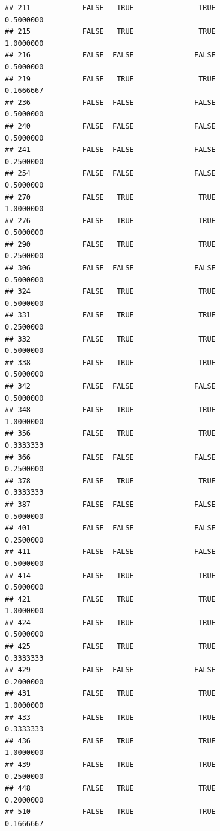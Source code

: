 \documentclass[
]{article}
\begin{document}
\begin{verbatim}
## 211            FALSE   TRUE               TRUE                0.5000000
## 215            FALSE   TRUE               TRUE                1.0000000
## 216            FALSE  FALSE              FALSE                0.5000000
## 219            FALSE   TRUE               TRUE                0.1666667
## 236            FALSE  FALSE              FALSE                0.5000000
## 240            FALSE  FALSE              FALSE                0.5000000
## 241            FALSE  FALSE              FALSE                0.2500000
## 254            FALSE  FALSE              FALSE                0.5000000
## 270            FALSE   TRUE               TRUE                1.0000000
## 276            FALSE   TRUE               TRUE                0.5000000
## 290            FALSE   TRUE               TRUE                0.2500000
## 306            FALSE  FALSE              FALSE                0.5000000
## 324            FALSE   TRUE               TRUE                0.5000000
## 331            FALSE   TRUE               TRUE                0.2500000
## 332            FALSE   TRUE               TRUE                0.5000000
## 338            FALSE   TRUE               TRUE                0.5000000
## 342            FALSE  FALSE              FALSE                0.5000000
## 348            FALSE   TRUE               TRUE                1.0000000
## 356            FALSE   TRUE               TRUE                0.3333333
## 366            FALSE  FALSE              FALSE                0.2500000
## 378            FALSE   TRUE               TRUE                0.3333333
## 387            FALSE  FALSE              FALSE                0.5000000
## 401            FALSE  FALSE              FALSE                0.2500000
## 411            FALSE  FALSE              FALSE                0.5000000
## 414            FALSE   TRUE               TRUE                0.5000000
## 421            FALSE   TRUE               TRUE                1.0000000
## 424            FALSE   TRUE               TRUE                0.5000000
## 425            FALSE   TRUE               TRUE                0.3333333
## 429            FALSE  FALSE              FALSE                0.2000000
## 431            FALSE   TRUE               TRUE                1.0000000
## 433            FALSE   TRUE               TRUE                0.3333333
## 436            FALSE   TRUE               TRUE                1.0000000
## 439            FALSE   TRUE               TRUE                0.2500000
## 448            FALSE   TRUE               TRUE                0.2000000
## 510            FALSE   TRUE               TRUE                0.1666667

\end{verbatim}
\end{document}
